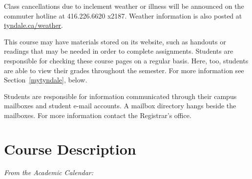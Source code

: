 \begin{titlepage}
\begin{center}
    \begin{description}\footnotesize
      \item[Commuter Hotline]
        Class cancellations due to inclement weather or illness will be
        announced on the commuter hotline at
        { 416.226.6620 x2187}.
        Weather information is also posted at
        \href{http://tyndale.ca/weather}{tyndale.ca/weather}.
      \item[MyTyndale.ca]
        This course may have materials stored on its website, such as
        handouts or readings that may be needed in order to complete
        assignments. Students are responsible for checking these course
        pages on a regular basis. Here, too, students are able to view
        their grades throughout the semester. For more information see
        Section~\ref{mytyndale}, below.
      \item[Mail]
        Students are responsible for information communicated through
        their campus mailboxes and student e-mail accounts. A mailbox
        directory hangs beside the mailboxes. For more information
        contact the Registrar's office.
    \end{description}

  \end{center}

  \section{Course Description}
  \label{description}

  \emph{From the Academic Calendar:} \cdescrip

\end{titlepage}
\setcounter{page}{2} %
